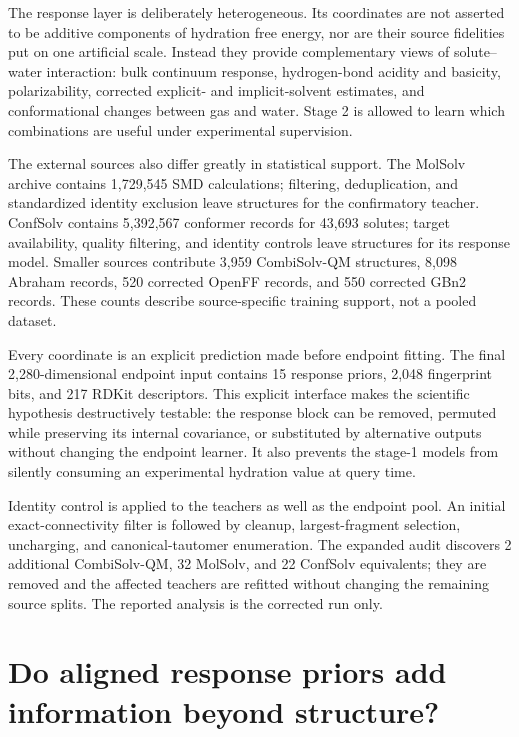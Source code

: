 \documentclass{article}
\begin{document}
The response layer is deliberately heterogeneous. Its coordinates are not asserted to
be additive components of hydration free energy, nor are their source fidelities put
on one artificial scale. Instead they provide complementary views of solute--water
interaction: bulk continuum response, hydrogen-bond acidity and basicity,
polarizability, corrected explicit- and implicit-solvent estimates, and conformational
changes between gas and water. Stage 2 is allowed to learn which combinations are
useful under experimental supervision.

The external sources also differ greatly in statistical support. The MolSolv archive
contains 1,729,545 SMD calculations; filtering, deduplication, and standardized
identity exclusion leave \MolSolvN{} structures for the confirmatory teacher.
ConfSolv contains 5,392,567 conformer records for 43,693 solutes; target availability,
quality filtering, and identity controls leave \ConfSolvN{} structures for its
response model. Smaller sources contribute 3,959 CombiSolv-QM structures, 8,098
Abraham records, 520 corrected OpenFF records, and 550 corrected GBn2 records. These
counts describe source-specific training support, not a pooled dataset.

Every coordinate is an explicit prediction made before endpoint fitting. The final
2,280-dimensional endpoint input contains 15 response priors, 2,048 fingerprint bits,
and 217 RDKit descriptors. This explicit interface makes the scientific hypothesis
destructively testable: the response block can be removed, permuted while preserving
its internal covariance, or substituted by alternative outputs without changing the
endpoint learner. It also prevents the stage-1 models from silently consuming an
experimental hydration value at query time.

Identity control is applied to the teachers as well as the endpoint pool. An initial
exact-connectivity filter is followed by cleanup, largest-fragment selection,
uncharging, and canonical-tautomer enumeration. The expanded audit discovers 2
additional CombiSolv-QM, 32 MolSolv, and 22 ConfSolv equivalents; they are removed and
the affected teachers are refitted without changing the remaining source splits. The
reported analysis is the corrected run only.

\section{Do aligned response priors add information beyond structure?}
\end{document}
